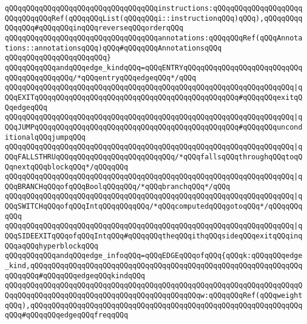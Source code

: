 \verb|qQQqqQQqqQQqqQQqqQQqqQQqqQQqqQQqqQQqinstructions:qQQqqQQqqQQqqQQqqQQqqQQqqQQqqQQqRef(qQQqqQQqList(qQQqqQQqi::instructionqQQq)qQQq),qQQqqQQqqQQqqQQq#qQQqqQQqinqQQqreverseqQQqorderqQQq|\newline
\verb|qQQqqQQqqQQqqQQqqQQqqQQqqQQqqQQqqQQqannotations:qQQqqQQqRef(qQQqAnnotations::annotationsqQQq)qQQq#qQQqqQQqAnnotationsqQQq|\newline
\verb|qQQqqQQqqQQqqQQqqQQqqQQq}|\newline
\newline
\newline
\verb|qQQqqQQqqQQqandqQQqedge_kindqQQq=qQQqENTRYqQQqqQQqqQQqqQQqqQQqqQQqqQQqqQQqqQQqqQQqqQQq/*qQQqentryqQQqedgeqQQq*/qQQq|\newline
\verb|qQQqqQQqqQQqqQQqqQQqqQQqqQQqqQQqqQQqqQQqqQQqqQQqqQQqqQQqqQQqqQQqqQQq|\verb#|qQQqEXITqQQqqQQqqQQqqQQqqQQqqQQqqQQqqQQqqQQqqQQqqQQqqQQq#\verb|#qQQqqQQqexitqQQqedgeqQQq|\newline
\verb|qQQqqQQqqQQqqQQqqQQqqQQqqQQqqQQqqQQqqQQqqQQqqQQqqQQqqQQqqQQqqQQqqQQq|\verb#|qQQqJUMPqQQqqQQqqQQqqQQqqQQqqQQqqQQqqQQqqQQqqQQqqQQqqQQq#\verb|#qQQqqQQqunconditionalqQQqjumpqQQq|\newline
\verb|qQQqqQQqqQQqqQQqqQQqqQQqqQQqqQQqqQQqqQQqqQQqqQQqqQQqqQQqqQQqqQQqqQQq|\verb#|qQQqFALLSTHRUqQQqqQQqqQQqqQQqqQQqqQQqqQQq/*qQQqfallsqQQqthroughqQQqtoqQQqnextqQQqblockqQQq*/qQQqqQQq#\newline
\verb|qQQqqQQqqQQqqQQqqQQqqQQqqQQqqQQqqQQqqQQqqQQqqQQqqQQqqQQqqQQqqQQqqQQq|\verb#|qQQqBRANCHqQQqofqQQqBoolqQQqqQQq/*qQQqbranchqQQq*/qQQq#\newline
\verb|qQQqqQQqqQQqqQQqqQQqqQQqqQQqqQQqqQQqqQQqqQQqqQQqqQQqqQQqqQQqqQQqqQQq|\verb#|qQQqSWITCHqQQqofqQQqIntqQQqqQQqqQQq/*qQQqcomputedqQQqgotoqQQq*/qQQqqQQqqQQq#\newline
\verb|qQQqqQQqqQQqqQQqqQQqqQQqqQQqqQQqqQQqqQQqqQQqqQQqqQQqqQQqqQQqqQQqqQQq|\verb#|qQQqSIDEEXITqQQqofqQQqIntqQQq#\verb|#qQQqqQQqtheqQQqithqQQqsideqQQqexitqQQqinqQQqaqQQqhyperblockqQQq|\newline
\newline
\verb|qQQqqQQqqQQqandqQQqedge_infoqQQq=qQQqEDGEqQQqofqQQq{qQQqk:qQQqqQQqedge_kind,qQQqqQQqqQQqqQQqqQQqqQQqqQQqqQQqqQQqqQQqqQQqqQQqqQQqqQQqqQQqqQQqqQQqqQQq#qQQqqQQqedgeqQQqkindqQQq|\newline
\verb|qQQqqQQqqQQqqQQqqQQqqQQqqQQqqQQqqQQqqQQqqQQqqQQqqQQqqQQqqQQqqQQqqQQqqQQqqQQqqQQqqQQqqQQqqQQqqQQqqQQqqQQqqQQqqQQqqQQqw:qQQqqQQqRef(qQQqweightqQQq),qQQqqQQqqQQqqQQqqQQqqQQqqQQqqQQqqQQqqQQqqQQqqQQqqQQqqQQqqQQqqQQqqQQq#qQQqqQQqedgeqQQqfreqqQQq|\newline
